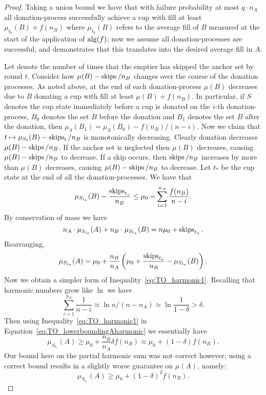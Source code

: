 \begin{proof}
  Taking a union bound we have that with failure probability at
  most $q \cdot n_A$ all donation-process successfully achieve a cup
  with fill at least $\mu_{t_0}(B) + f(n_B)$ where $\mu_{t_0}(B)$
  refers to the average fill of $B$ measured at the start of the
  application of $\operatorname{\text{\textup{alg}}}(f)$; now we assume all donation-processes
  are successful, and demonstrates that this translates into the
  desired average fill in $A$.

  Let  denote the number of times that the
  emptier has skipped the anchor set by round $t$. Consider how
  $\mu(B) - \operatorname{\text{\textup{skips}}}/n_B$ changes over the course of the donation
  processes. As noted above, at the end of each donation-process
  $\mu(B)$ decreases due to $B$ donating a cup with fill at least
  $\mu(B) + f(n_B)$. In particular, if $S$ denotes the cup state
  immediately before a cup is donated on the $i$-th
  donation-process, $B_0$ denotes the set $B$ before
  the donation and $B_1$ denotes the set $B$ after the donation,
  then $\mu_{S}(B_1) = \mu_{S}(B_0) - f(n_B) / (n-i)$. Now we claim that
  $t\mapsto \mu_{S_t}(B) - \operatorname{\text{\textup{skips}}}_t/n_B$ is monotonically decreasing. 
  Clearly donation decreases $\mu(B) - \operatorname{\text{\textup{skips}}}/n_B$. 
  If the anchor set is neglected then $\mu(B)$ decreases, causing
  $\mu(B) - \operatorname{\text{\textup{skips}}}/n_B$ to decrease. 
  If a skip occurs, then $\operatorname{\text{\textup{skips}}}/n_B$ increases by more than
  $\mu(B)$ decreases, causing $\mu(B)-\operatorname{\text{\textup{skips}}}/n_B$ to decrease. 
  Let $t_*$ be the cup state at the end of all the
  donation-processes. We have that 
  \begin{equation}
    \label{eq:TO_harmonic1}
    \mu_{S_{t_*}}(B) - \frac{\operatorname{\text{\textup{skips}}}_{t_*}}{n_B} \le \mu_0 - \sum_{i=1}^{n_A}\frac{f(n_B)}{n-i}.
  \end{equation}
  By conservation of mass we have 
  $$n_A\cdot \mu_{S_{t_*}}(A) + n_B\cdot \mu_{S_{t_*}}(B) = n\mu_0 + \operatorname{\text{\textup{skips}}}_{t_*}.$$
  Rearranging, 
  \begin{equation}
    \label{eq:TO_lowerboundingAharmonic}
    \mu_{S_{t_*}}(A) = \mu_0 + \frac{n_B}{n_A}\left( \mu_0 +
    \frac{\operatorname{\text{\textup{skips}}}_{t_*}}{n_B} - \mu_{S_{t_*}}(B) \right).
  \end{equation}
  Now we obtain a simpler form of
  Inequality~\eqref{eq:TO_harmonic1}. Recalling that harmonic
  numbers grow like $\ln$ we have
  $$\sum_{i=1}^{n_A} \frac{1}{n-i} \approx \ln n/(n-n_A) \approx
  \ln \frac{1}{1-\delta} > \delta.$$
  Then using Inequality~\eqref{eq:TO_harmonic1} in
  Equation~\ref{eq:TO_lowerboundingAharmonic} we essentially have
  $$\mu_{S_{t_*}}(A) \ge \mu_0 + \frac{n_B}{n_A} \delta f(n_B)
  \approx \mu_0 + (1-\delta) f(n_B).$$
  Our bound here on the partial harmonic sum was not correct
  however; using a correct bound results in a slightly worse
  guarantee on $\mu(A)$, namely:
  $$\mu_{S_{t_*}}(A) \ge \mu_0 + (1-\delta)^2 f(n_B).$$


\end{proof}
